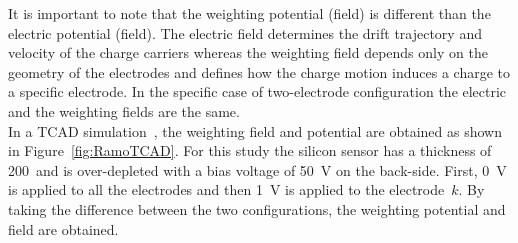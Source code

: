  It is important to note that the weighting potential (field) is
 different than the electric potential (field). The electric field
 determines the drift trajectory and velocity of the charge carriers
 whereas the weighting field depends only on the geometry of the
 electrodes and defines how the charge motion induces a charge to a
 specific electrode. In the specific case of two-electrode configuration the
 electric and the weighting fields are the same. \\
In a TCAD simulation~\cite{synopsysTCAD}, the weighting field and potential are obtained
as shown in Figure~\ref{fig:RamoTCAD}. For this study the silicon
sensor has a thickness of 200~\micron and is over-depleted with a bias
voltage of \SI{50}{\volt} on the back-side. First, \SI{0}{\volt} is
applied to all the electrodes and then \SI{1}{\volt} is applied to the
electrode~$k$. By taking the difference between the two
configurations, the weighting potential and field are obtained.


